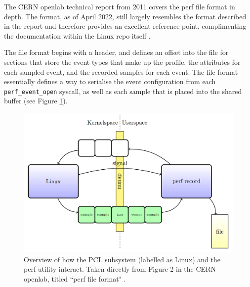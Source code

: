 The CERN openlab technical report from 2011 \cite{CERN_openlab_perf_file_format} covers the perf file format in depth. The format, as of April 2022, still largely resembles the format described in the report and therefore provides an excellent reference point, complimenting the documentation within the Linux repo itself \cite{GithubPerfFileFormat}.

The file format begins with a header, and defines an offset into the file for sections that store the event types that make up the profile, the attributes for each sampled event, and the recorded samples for each event. The file format essentially defines a way to serialise the event configuration from each \texttt{perf\_event\_open} syscall, as well as each sample that is placed into the shared buffer (see Figure \ref{fig:perf_design}). 

\begin{figure}[!h]
\centering
    \includegraphics[width=0.8\linewidth]{report-a_perf_design}
    \caption{Overview of how the PCL subsystem (labelled as Linux) and the perf utility interact. Taken directly from Figure 2 in the CERN openlab, titled ``perf file format" \cite{CERN_openlab_perf_file_format}.}
    \label{fig:perf_design}
\end{figure}

